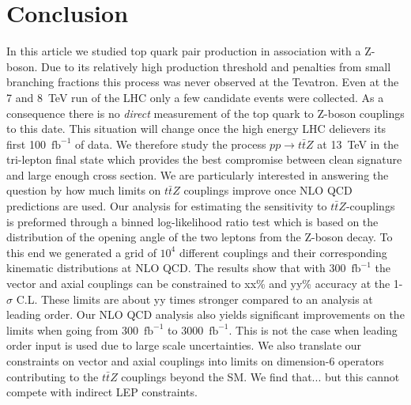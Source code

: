 \documentclass[preprint]{JHEP3} %
\def\ttbZ{t\bar{t}Z}
\def\invfb {\mathrm{fb}^{-1}}
\begin{document}
\section{Conclusion}
In this article we studied top quark pair production in association with a Z-boson.
Due to its relatively high production threshold and 
penalties from small branching fractions 
this process was never observed at the Tevatron.
Even at the 7 and 8~TeV run of the LHC only a few candidate events were collected.
As a consequence there is no {\it direct} measurement of the top quark to Z-boson couplings to this date. 
This situation will change once the high energy LHC delievers its first 100~$\invfb$ of data.
We therefore study the process $pp\to\ttbZ$ at 13~TeV in the tri-lepton final state  
which provides the best compromise between clean signature and large enough cross section. 
We are particularly interested in answering the question by how much limits on
$\ttbZ$ couplings improve once NLO QCD predictions are used.
Our analysis for estimating the sensitivity to $\ttbZ$-couplings is preformed through a binned log-likelihood ratio test which is based on the 
distribution of the opening angle of the two leptons from the Z-boson decay.
To this end we generated a grid of $10^4$ different couplings and their corresponding kinematic distributions at NLO QCD. 
The results show that with 300~$\invfb$ the vector and axial couplings can be constrained to xx\% and yy\% accuracy at the 1-$\sigma$ C.L.
These limits are about yy times stronger compared to an analysis at leading order.
Our NLO QCD analysis also yields significant improvements on the limits when going from 300~$\invfb$ to 3000~$\invfb$.
This is not the case when leading order input is used due to large scale uncertainties.
We also translate our constraints on vector and axial couplings into limits on dimension-6 operators contributing to the $\ttbZ$ couplings beyond the SM.
We find that... but this cannot compete with indirect LEP constraints.
\end{document}
